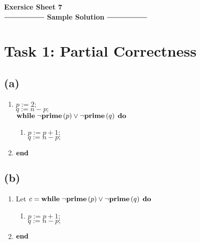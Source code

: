\documentclass[12pt]{scrartcl}
\begin{document}
\begin{center}
	\huge\textbf{Exersice Sheet 7}\\[0.5cm]
	
	\Large
	$\mathrel{\vcenter{\hbox{\rule{2cm}{0.5pt}}}}$ \textbf{Sample 				Solution} $\mathrel{\vcenter{\hbox{\rule{2cm}{0.5pt}}}}$\\[1cm]
\end{center}
	\large
	
	\setlength{\marginparwidth}{0pt}
	
	\section*{Task 1: Partial Correctness}
	
	\subsection*{(a)}
	
	\begin{enumerate}
	\item[] $p:=2;$\\
			$q:=n-p;$\\
			$\text{\textbf{while}}\;\neg\text{\textbf{prime}}\left(p\right)\vee\neg\text{\textbf{prime}}\left(q\right)\;\text{\textbf{do}}$
			\begin{enumerate}
			\item[] $p:=p+1;$\\
					$q:=n-p;$
			\end{enumerate}
	\item[] $\text{\textbf{end}}$
	\end{enumerate}

	\subsection*{(b)}
	
	
	\normalsize
	
	\begin{enumerate}
	\item[] Let $c=\text{\textbf{while}}\;\neg\text{\textbf{prime}}\left(p\right)\vee\neg\text{\textbf{prime}}\left(q\right)\;\text{\textbf{do}}$
			\begin{enumerate}
			\item[] $p:=p+1;$\\
					$q:=n-p;$
			\end{enumerate}
	\item[] $\text{\textbf{end}}$
	\end{enumerate}		
	
\end{document}
